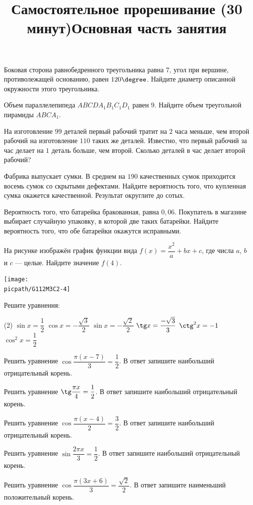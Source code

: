 \begin{class}[number=3]
	\title{Самостоятельное прорешивание (30 минут)}
	\begin{listofex}
		\item Боковая сторона равнобедренного треугольника равна \( 7 \), угол при вершине, противолежащей основанию, равен \( 120\degree \). Найдите диаметр описанной окружности этого треугольника.
		\item Объем параллелепипеда \( ABCDA_1B_1C_1D_1 \) равен \( 9 \). Найдите объем треугольной пирамиды \( ABCA_1 \).
		\item На изготовление \( 99 \) деталей первый рабочий тратит на \( 2 \) часа меньше, чем второй рабочий на изготовление \( 110 \) таких же деталей. Известно, что первый рабочий за час делает на \( 1 \) деталь больше, чем второй. Сколько деталей в час делает второй рабочий?
		\item Фабрика выпускает сумки. В среднем на \( 190 \) качественных сумок приходится восемь сумок со скрытыми дефектами. Найдите вероятность того, что купленная сумка окажется качественной. Результат округлите до сотых.
		\item Вероятность того, что батарейка бракованная, равна \( 0,06 \). Покупатель в магазине выбирает случайную упаковку, в которой две таких батарейки. Найдите вероятность того, что обе батарейки окажутся исправными.
		\item На рисунке изображён график функции вида \( f(x)=\dfrac{x^2}{a}+bx+c \),  где числа \( a \), \( b \) и \( c \) --- целые. Найдите значение \( f(4) \).
		\begin{center}
			\texttt{[image: \\picpath/G112M3C2-4]}
		\end{center}
	\end{listofex}
	\newpage
	\title{Основная часть занятия}
	\begin{listofex}
		\item Решите уравнения:
		\begin{tasks}(2)
			\task \( \sin x=\dfrac{1}{2} \)
			\task \( \cos x=-\dfrac{\sqrt{3}}{2} \)
			\task \( \sin x = -\dfrac{\sqrt{2}}{2} \)
			\task \( \tg x = \dfrac{-\sqrt{3}}{3} \)
			\task \( \ctg^2 x = -1 \)
			\task \( \cos^2 x = \dfrac{1}{2} \)
		\end{tasks}
		\item Решить уравнение \( \cos\dfrac{\pi(x-7)}{3}=\dfrac{1}{2} \). В ответ запишите наибольший отрицательный корень.
		\item Решить уравнение \( \tg\dfrac{\pi x}{4}=\dfrac{1}{2} \). В ответ запишите наибольший отрицательный корень.
		\item Решить уравнение \( \cos\dfrac{\pi(x-4)}{2}=\dfrac{3}{2} \). В ответ запишите наибольший отрицательный корень.
		\item Решить уравнение \( \sin\dfrac{2\pi x}{3}=\dfrac{1}{2} \). В ответ запишите наибольший отрицательный корень.
		\item Решить уравнение \( \cos\dfrac{\pi(3x+6)}{3}=\dfrac{\sqrt{2}}{2} \). В ответ запишите наименьший положительный корень.
	\end{listofex}
\end{class}


